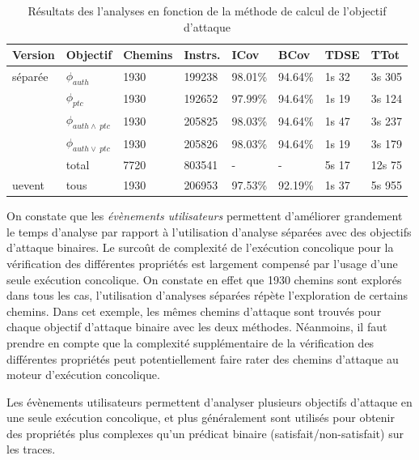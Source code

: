             \begin{table}[h]
                \caption{Résultats des l'analyses en fonction de la méthode de calcul de l'objectif d'attaque}
                \label{tbl:vp-oracles}
                \small
                \begin{center}
                \begin{tabular}{l|l|l|l|l|l|l|l}
                Version & Objectif & Chemins & Instrs. & ICov & BCov & TDSE & TTot \\
                \hline
                séparée & $\phi_{auth}$ & 1930 & 199238 & 98.01\% & 94.64\% & 1s 32 & 3s 305 \\
                 & $\phi_{ptc}$ & 1930 & 192652 & 97.99\% & 94.64\% & 1s 19 & 3s 124 \\
                 & $\phi_{auth\land~ptc}$ & 1930 & 205825 & 98.03\% & 94.64\% & 1s 47 & 3s 237 \\
                 & $\phi_{auth\lor~ptc}$ & 1930 & 205826 & 98.03\% & 94.64\% & 1s 19 & 3s 179 \\
                 & total & 7720 & 803541 & - & - & 5s 17 & 12s 75 \\
                \hline
                uevent & tous & 1930 & 206953 & 97.53\% & 92.19\% & 1s 37 & 5s 955
                \end{tabular}
            \end{center}
            \end{table} 
        
            On constate que les \textit{évènements utilisateurs} permettent d'améliorer grandement le temps d'analyse par rapport à l'utilisation d'analyse séparées avec des objectifs d'attaque binaires. 
            Le surcoût de complexité de l'exécution concolique pour la vérification des différentes propriétés est largement compensé par l'usage d'une seule exécution concolique. On constate en effet que 1930 chemins sont explorés dans tous les cas, l'utilisation d'analyses séparées répète l'exploration de certains chemins. 
            Dans cet exemple, les mêmes chemins d'attaque sont trouvés pour chaque objectif d'attaque binaire avec les deux méthodes.
            Néanmoins, il faut prendre en compte que la complexité supplémentaire de la vérification des différentes propriétés peut potentiellement faire rater des chemins d'attaque au moteur d'exécution concolique.
            
            Les évènements utilisateurs permettent d'analyser plusieurs objectifs d'attaque en une seule exécution concolique, et plus généralement sont utilisés pour obtenir des propriétés plus complexes qu'un prédicat binaire (satisfait/non-satisfait) sur les traces.
        
